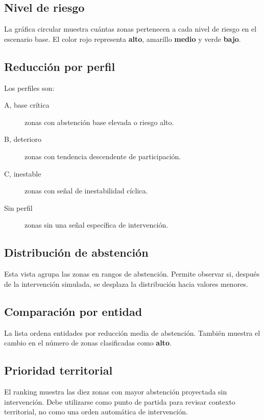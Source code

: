 \documentclass[11pt,a4paper]{article}
\newcommand{\alto}{\textcolor{riskred}{\textbf{alto}}}
\newcommand{\medio}{\textcolor{riskamber}{\textbf{medio}}}
\newcommand{\bajo}{\textcolor{riskgreen}{\textbf{bajo}}}
\begin{document}
\subsection{Nivel de riesgo}

La gráfica circular muestra cuántas zonas pertenecen a cada nivel de riesgo en el escenario base. El color rojo representa \alto{}, amarillo \medio{} y verde \bajo{}.

\subsection{Reducción por perfil}

Los perfiles son:

\begin{description}
    \item[A, base crítica] zonas con abstención base elevada o riesgo alto.
    \item[B, deterioro] zonas con tendencia descendente de participación.
    \item[C, inestable] zonas con señal de inestabilidad cíclica.
    \item[Sin perfil] zonas sin una señal específica de intervención.
\end{description}

\subsection{Distribución de abstención}

Esta vista agrupa las zonas en rangos de abstención. Permite observar si, después de la intervención simulada, se desplaza la distribución hacia valores menores.

\subsection{Comparación por entidad}

La lista ordena entidades por reducción media de abstención. También muestra el cambio en el número de zonas clasificadas como \alto{}.

\subsection{Prioridad territorial}

El ranking muestra las diez zonas con mayor abstención proyectada sin intervención. Debe utilizarse como punto de partida para revisar contexto territorial, no como una orden automática de intervención.
\end{document}
